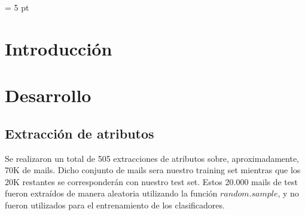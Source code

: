 \documentclass[a4paper]{article}
\begin{document}
\parskip = 5 pt
\thispagestyle{empty}

\maketitle

\newpage
\tableofcontents
\thispagestyle{empty}

\newpage
\section{Introducción}

\newpage

\section{Desarrollo}

\subsection{Extracción de atributos}
Se realizaron un total de 505 extracciones de atributos sobre, aproximadamente, 70K de mails. Dicho conjunto de mails sera nuestro training set mientras que los 20K restantes se corresponderán con nuestro test set. Estos 20.000 mails de test fueron extraídos de manera aleatoria utilizando la función $random.sample$, y no fueron utilizados para el entrenamiento de los clasificadores.
\end{document}
